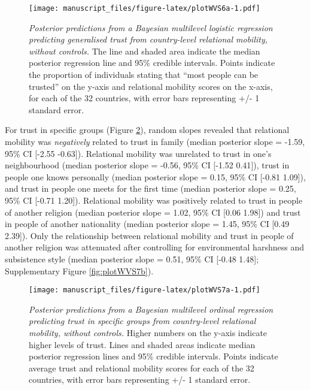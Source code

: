 \documentclass[
  man,floatsintext]{apa6}
\begin{document}
\begin{figure}
\centering
\texttt{[image: manuscript\_files/figure-latex/plotWVS6a-1.pdf]}
\caption{\label{fig:plotWVS6a}\emph{Posterior predictions from a Bayesian multilevel logistic regression predicting generalised trust from country-level relational mobility, without controls.} The line and shaded area indicate the median posterior regression line and 95\% credible intervals. Points indicate the proportion of individuals stating that ``most people can be trusted'' on the y-axis and relational mobility scores on the x-axis, for each of the 32 countries, with error bars representing +/- 1 standard error.}
\end{figure}

For trust in specific groups (Figure \ref{fig:plotWVS7a}), random slopes revealed that relational mobility was \emph{negatively} related to trust in family (median posterior slope = -1.59, 95\% CI {[}-2.55 -0.63{]}). Relational mobility was unrelated to trust in one's neighbourhood (median posterior slope = -0.56, 95\% CI {[}-1.52 0.41{]}), trust in people one knows personally (median posterior slope = 0.15, 95\% CI {[}-0.81 1.09{]}), and trust in people one meets for the first time (median posterior slope = 0.25, 95\% CI {[}-0.71 1.20{]}). Relational mobility was positively related to trust in people of another religion (median posterior slope = 1.02, 95\% CI {[}0.06 1.98{]}) and trust in people of another nationality (median posterior slope = 1.45, 95\% CI {[}0.49 2.39{]}). Only the relationship between relational mobility and trust in people of another religion was attenuated after controlling for environmental harshness and subsistence style (median posterior slope = 0.51, 95\% CI {[}-0.48 1.48{]}; Supplementary Figure \ref{fig:plotWVS7b}).



\begin{figure}
\centering
\texttt{[image: manuscript\_files/figure-latex/plotWVS7a-1.pdf]}
\caption{\label{fig:plotWVS7a}\emph{Posterior predictions from a Bayesian multilevel ordinal regression predicting trust in specific groups from country-level relational mobility, without controls.} Higher numbers on the y-axis indicate higher levels of trust. Lines and shaded areas indicate median posterior regression lines and 95\% credible intervals. Points indicate average trust and relational mobility scores for each of the 32 countries, with error bars representing +/- 1 standard error.}
\end{figure}
\end{document}
